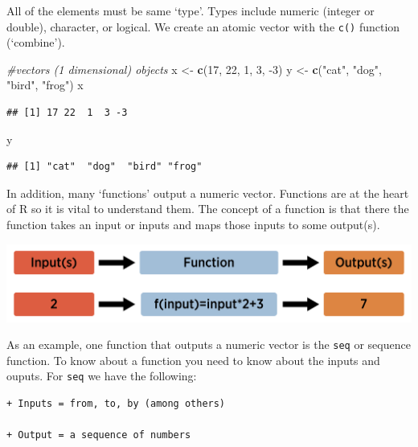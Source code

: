 \documentclass[
]{book}
\newenvironment{Shaded}{\begin{snugshade}}{\end{snugshade}}
\newcommand{\CommentTok}[1]{\textcolor[rgb]{0.56,0.35,0.01}{\textit{#1}}}
\newcommand{\DecValTok}[1]{\textcolor[rgb]{0.00,0.00,0.81}{#1}}
\newcommand{\KeywordTok}[1]{\textcolor[rgb]{0.13,0.29,0.53}{\textbf{#1}}}
\newcommand{\NormalTok}[1]{#1}
\newcommand{\StringTok}[1]{\textcolor[rgb]{0.31,0.60,0.02}{#1}}
\theoremstyle{definition}
\theoremstyle{definition}
\theoremstyle{definition}
\theoremstyle{remark}
\begin{document}
All of the elements must be same `type'. Types include numeric (integer or double), character, or logical. We create an atomic vector with the \texttt{c()} function (`combine').

\begin{Shaded}
\begin{Highlighting}[]
\CommentTok{#vectors (1 dimensional) objects}
\NormalTok{x <-}\StringTok{ }\KeywordTok{c}\NormalTok{(}\DecValTok{17}\NormalTok{, }\DecValTok{22}\NormalTok{, }\DecValTok{1}\NormalTok{, }\DecValTok{3}\NormalTok{, }\DecValTok{-3}\NormalTok{)}
\NormalTok{y <-}\StringTok{ }\KeywordTok{c}\NormalTok{(}\StringTok{"cat"}\NormalTok{, }\StringTok{"dog"}\NormalTok{, }\StringTok{"bird"}\NormalTok{, }\StringTok{"frog"}\NormalTok{)}
\NormalTok{x}
\end{Highlighting}
\end{Shaded}

\begin{verbatim}
## [1] 17 22  1  3 -3
\end{verbatim}

\begin{Shaded}
\begin{Highlighting}[]
\NormalTok{y}
\end{Highlighting}
\end{Shaded}

\begin{verbatim}
## [1] "cat"  "dog"  "bird" "frog"
\end{verbatim}

In addition, many `functions' output a numeric vector. Functions are at the heart of R so it is vital to understand them. The concept of a function is that there the function takes an input or inputs and maps those inputs to some output(s).

\begin{center}\includegraphics[width=0.8\linewidth]{img/funVisual1F} \end{center}

As an example, one function that outputs a numeric vector is the \texttt{seq} or sequence function. To know about a function you need to know about the inputs and ouputs. For \texttt{seq} we have the following:

\begin{verbatim}
+ Inputs = from, to, by (among others)  

+ Output = a sequence of numbers
\end{verbatim}
\end{document}

